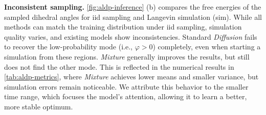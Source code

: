 \textbf{Inconsistent sampling.} \cref{fig:aldp-inference} (b) compares the free energies of the sampled dihedral angles for iid sampling and Langevin simulation (sim). While all methods can match the training distribution under iid sampling, simulation quality varies, and existing models show inconsistencies. Standard \emph{Diffusion} fails to recover the low-probability mode (i.e., $\varphi > 0$) completely, even when starting a simulation from these regions. \emph{Mixture} generally improves the results, but still does not find the other mode. This is reflected in the numerical results in \cref{tab:aldp-metrics}, where \emph{Mixture} achieves lower means and smaller variance, but simulation errors remain noticeable. We attribute this behavior to the smaller time range, which focuses the model's attention, allowing it to learn a better, more stable optimum.

